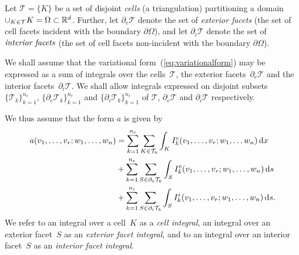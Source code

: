 Let $\mathcal{T} = \{K\}$ be a set of disjoint \emph{cells} (a
triangulation) partitioning a domain $\cup_{K\in\mathcal{T}} K =
\Omega \subset \mathbb{R}^d$. Further, let $\partial_e \mathcal{T}$ denote the
set of \emph{exterior facets} (the set of cell facets incident with
the boundary $\partial \Omega$), and let $\partial_i \mathcal{T}$
denote the set of $\emph{interior facets}$ (the set of cell facets
non-incident with the boundary $\partial \Omega$).

We shall assume that the variational form~(\ref{eq:variationalform})
may be expressed as a sum of integrals over the cells~$\mathcal{T}$,
the exterior facets~$\partial_e \mathcal{T}$ and the interior
facets~$\partial_i \mathcal{T}$. We shall allow integrals expressed on
disjoint subsets $\{\mathcal{T}_k\}_{k=1}^{n_c}$, $\{\partial_e
\mathcal{T}_k\}_{k=1}^{n_e}$ and $\{\partial_i
\mathcal{T}_k\}_{k=1}^{n_i}$ of $\mathcal{T}$, $\partial_e
\mathcal{T}$ and $\partial_i \mathcal{T}$ respectively.

We thus assume that the form $a$ is given by
\begin{equation}
  \begin{split}
    a(v_1, \ldots, v_r; w_1, \ldots,  w_n)
    &=
    \sum_{k=1}^{n_c} \sum_{K\in\mathcal{T}_k} \int_{K}
    I^c_k(v_1, \ldots, v_r; w_1, \ldots w_n) \, \mathrm{d}x \\
    &+
    \sum_{k=1}^{n_e} \sum_{S\in\partial_e\mathcal{T}_k} \int_{S}
    I^e_k(v_1, \ldots, v_r; w_1, \ldots,  w_n) \, \mathrm{d}s \\
    &+
    \sum_{k=1}^{n_i} \sum_{S\in\partial_i\mathcal{T}_k} \int_{S}
    I^i_k(v_1, \ldots, v_r; w_1, \ldots, w_n) \, \mathrm{d}s.
  \end{split} \label{eq:form_integrals}
\end{equation}
We refer to an integral over a cell~$K$ as a \emph{cell integral},
an integral over an exterior facet~$S$ as an \emph{exterior facet integral},
and to an integral over an interior facet~$S$ as an \emph{interior facet integral}.


